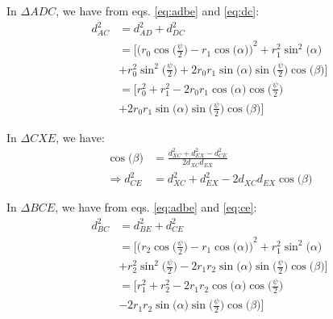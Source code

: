     In $\Delta ADC$, we have from eqs. \eqref{eq:adbe} and \eqref{eq:dc}:
    \begin{equation}
    \label{eq:ac}
        \begin{aligned}
            d_{AC}^2 &= d_{AD}^2 + d_{DC}^2\\
            &= \Bigg[ {\Big(r_0  \cos \Big(\displaystyle\frac{\psi}{2}\Big) - r_1  \cos \big(\alpha\big) \Big)}^2 + r_1^2  \sin^2 \big( \alpha \big)\\
            &+ r_0^2  \sin^2 \Big(\displaystyle\frac{\psi}{2}\Big) + 2  r_0  r_1 \sin \big( \alpha \big)  \sin \Big(\displaystyle\frac{\psi}{2}\Big)  \cos \big( \beta \big) \Bigg]\\
            &= \Bigg[ r_0^2 + r_1^2 - 2  r_0  r_1  \cos \big( \alpha \big)  \cos \Big(\displaystyle\frac{\psi}{2}\Big)\\
            &+ 2  r_0  r_1 \sin \big( \alpha \big)  \sin \Big(\displaystyle\frac{\psi}{2}\Big)  \cos \big( \beta \big) \Bigg]
        \end{aligned}
    \end{equation}

    In $\Delta CXE$, we have:
    \begin{equation}
    \label{eq:ce}
        \begin{aligned}
            \cos \big( \beta \big) &= \frac{d_{XC}^2 + d_{EX}^2 - d_{CE}^2}{2  d_{XC}  d_{EX}}\\
            \Rightarrow d_{CE}^2 &= d_{XC}^2 + d_{EX}^2 - 2  d_{XC}  d_{EX}  \cos \big( \beta \big)
        \end{aligned}
    \end{equation}

    In $\Delta BCE$, we have from eqs. \eqref{eq:adbe} and \eqref{eq:ce}:
    \begin{equation}
    \label{eq:bc}
        \begin{aligned}
            d_{BC}^2 &= d_{BE}^2 + d_{CE}^2\\
            &= \Bigg[ {\Big(r_2  \cos \Big(\displaystyle\frac{\psi}{2}\Big) - r_1  \cos \big(\alpha\big) \Big)}^2 + r_1^2  \sin^2 \big( \alpha \big)\\
            &+ r_2^2  \sin^2 \Big(\displaystyle\frac{\psi}{2}\Big) - 2  r_1  r_2 \sin \big( \alpha \big)  \sin \Big(\displaystyle\frac{\psi}{2}\Big)  \cos \big( \beta \big) \Bigg]\\
            &= \Bigg[ r_1^2 + r_2^2 - 2  r_1  r_2  \cos \big( \alpha \big)  \cos \Big(\displaystyle\frac{\psi}{2}\Big)\\
            &- 2  r_1  r_2 \sin \big( \alpha \big)  \sin \Big(\displaystyle\frac{\psi}{2}\Big)  \cos \big( \beta \big) \Bigg]
        \end{aligned}
    \end{equation}

